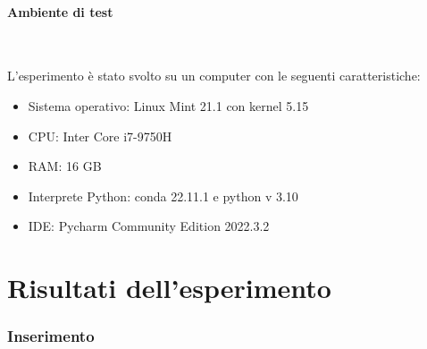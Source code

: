 \documentclass[
]{article}
\begin{document}
\hypertarget{ambiente-di-test}{%
\paragraph{Ambiente di test}\label{ambiente-di-test}}
\

L'esperimento è stato svolto su un computer con le seguenti
caratteristiche:

\begin{itemize}
\item
  Sistema operativo: Linux Mint 21.1 con kernel 5.15
\item
  CPU: Inter Core i7-9750H
\item
  RAM: 16 GB
\item
  Interprete Python: conda 22.11.1 e python v 3.10
\item
  IDE: Pycharm Community Edition 2022.3.2
\end{itemize}

\hypertarget{risultati-dellesperimento}{%
\section{Risultati dell'esperimento}\label{risultati-dellesperimento}}

\hypertarget{inserimento}{%
\subsubsection{Inserimento}\label{inserimento}}
\end{document}
